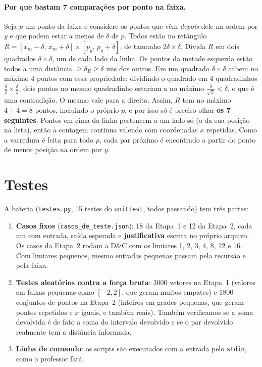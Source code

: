 \documentclass[11pt,a4paper]{article}
\begin{document}
\paragraph{Por que bastam 7 comparações por ponto na faixa.} Seja $p$ um ponto da faixa e considere os pontos que vêm \emph{depois} dele na ordem por $y$ e que podem estar a menos de $\delta$ de $p$. Todos estão no retângulo $R=[x_m-\delta,\,x_m+\delta]\times[p_y,\,p_y+\delta]$, de tamanho $2\delta\times\delta$. Divida $R$ em dois quadrados $\delta\times\delta$, um de cada lado da linha. Os pontos da metade esquerda estão todos a uma distância $\ge\delta_E\ge\delta$ uns dos outros. Em um quadrado $\delta\times\delta$ cabem no máximo 4 pontos com essa propriedade: dividindo o quadrado em 4 quadradinhos $\frac{\delta}{2}\times\frac{\delta}{2}$, dois pontos no mesmo quadradinho estariam a no máximo $\frac{\delta}{\sqrt2}<\delta$, o que é uma contradição. O mesmo vale para a direita. Assim, $R$ tem no máximo $4+4=8$ pontos, incluindo o próprio $p$, e por isso só é preciso olhar \textbf{os 7 seguintes}. Pontos em cima da linha pertencem a um lado só (o da sua posição na lista), então a contagem continua valendo com coordenadas $x$ repetidas. Como a varredura é feita para todo $p$, cada par próximo é encontrado a partir do ponto de menor posição na ordem por $y$.

\section{Testes}

A bateria (\texttt{testes.py}, 15 testes do \texttt{unittest}, todos passando) tem três partes:
\begin{enumerate}
  \item \textbf{Casos fixos} (\texttt{casos\_de\_teste.json}): 18 da Etapa~1 e 12 da Etapa~2, cada um com entrada, saída esperada e \textbf{justificativa} escrita no próprio arquivo. Os casos da Etapa~2 rodam a D\&C com os limiares 1, 2, 3, 4, 8, 12 e 16. Com limiares pequenos, mesmo entradas pequenas passam pela recursão e pela faixa.
  \item \textbf{Testes aleatórios contra a força bruta}: 3000 vetores na Etapa~1 (valores em faixas pequenas como $[-2,2]$, que geram muitos empates) e 1800 conjuntos de pontos na Etapa~2 (inteiros em grades pequenas, que geram pontos repetidos e $x$ iguais, e também reais). Também verificamos se a soma devolvida é de fato a soma do intervalo devolvido e se o par devolvido realmente tem a distância informada.
  \item \textbf{Linha de comando}: os scripts são executados com a entrada pelo \texttt{stdin}, como o professor fará.
\end{enumerate}
\end{document}

